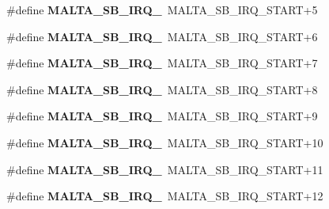 \begin{DoxyCompactItemize}
\mbox{\label{group__bsp__interrupt_gace22be7a1175178c4ede54af63cf7bfc}} 
\#define {\bfseries M\+A\+L\+T\+A\+\_\+\+S\+B\+\_\+\+I\+R\+Q\+\_}~M\+A\+L\+T\+A\+\_\+\+S\+B\+\_\+\+I\+R\+Q\+\_\+\+S\+T\+A\+RT+5
\item 
\mbox{\label{group__bsp__interrupt_gad78ef17055193e8bf3fa09ec5c01ebfa}} 
\#define {\bfseries M\+A\+L\+T\+A\+\_\+\+S\+B\+\_\+\+I\+R\+Q\+\_}~M\+A\+L\+T\+A\+\_\+\+S\+B\+\_\+\+I\+R\+Q\+\_\+\+S\+T\+A\+RT+6
\item 
\mbox{\label{group__bsp__interrupt_ga92e4f1a1ee8b2b16c1501731518b7326}} 
\#define {\bfseries M\+A\+L\+T\+A\+\_\+\+S\+B\+\_\+\+I\+R\+Q\+\_}~M\+A\+L\+T\+A\+\_\+\+S\+B\+\_\+\+I\+R\+Q\+\_\+\+S\+T\+A\+RT+7
\item 
\mbox{\label{group__bsp__interrupt_ga92e9043a213cd1ec52e39a63225d7a49}} 
\#define {\bfseries M\+A\+L\+T\+A\+\_\+\+S\+B\+\_\+\+I\+R\+Q\+\_}~M\+A\+L\+T\+A\+\_\+\+S\+B\+\_\+\+I\+R\+Q\+\_\+\+S\+T\+A\+RT+8
\item 
\mbox{\label{group__bsp__interrupt_ga7d8947615f7d6eee8c81af53cccae517}} 
\#define {\bfseries M\+A\+L\+T\+A\+\_\+\+S\+B\+\_\+\+I\+R\+Q\+\_}~M\+A\+L\+T\+A\+\_\+\+S\+B\+\_\+\+I\+R\+Q\+\_\+\+S\+T\+A\+RT+9
\item 
\mbox{\label{group__bsp__interrupt_ga1cefc191fa2e9c52fdd8d4cc773a3913}} 
\#define {\bfseries M\+A\+L\+T\+A\+\_\+\+S\+B\+\_\+\+I\+R\+Q\+\_}~M\+A\+L\+T\+A\+\_\+\+S\+B\+\_\+\+I\+R\+Q\+\_\+\+S\+T\+A\+RT+10
\item 
\mbox{\label{group__bsp__interrupt_ga8ade95fb241ac8973937f374ba6a0cc4}} 
\#define {\bfseries M\+A\+L\+T\+A\+\_\+\+S\+B\+\_\+\+I\+R\+Q\+\_}~M\+A\+L\+T\+A\+\_\+\+S\+B\+\_\+\+I\+R\+Q\+\_\+\+S\+T\+A\+RT+11
\item 
\mbox{\label{group__bsp__interrupt_gab4b4b513b82b0a53bd26c2331d9d9df6}} 
\#define {\bfseries M\+A\+L\+T\+A\+\_\+\+S\+B\+\_\+\+I\+R\+Q\+\_}~M\+A\+L\+T\+A\+\_\+\+S\+B\+\_\+\+I\+R\+Q\+\_\+\+S\+T\+A\+RT+12
\item 
\mbox{\label{group__bsp__interrupt_ga0a3a1137f16965b06679588751d19989}} 

\end{DoxyCompactItemize}
